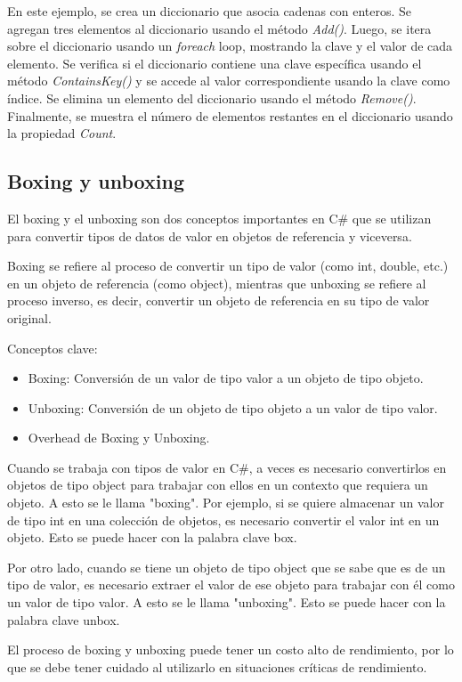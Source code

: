 \documentclass[executivepaper]{article}
\begin{document}
En este ejemplo, se crea un diccionario que asocia cadenas con enteros. Se agregan tres elementos al diccionario usando el método \emph{Add()}. Luego, se itera sobre el diccionario usando un \emph{foreach} loop, mostrando la clave y el valor de cada elemento. Se verifica si el diccionario contiene una clave específica usando el método \emph{ContainsKey()} y se accede al valor correspondiente usando la clave como índice. Se elimina un elemento del diccionario usando el método \emph{Remove()}. Finalmente, se muestra el número de elementos restantes en el diccionario usando la propiedad \emph{Count}.

\subsection*{Boxing y unboxing}

El boxing y el unboxing son dos conceptos importantes en C\# que se utilizan para convertir tipos de datos de valor en objetos de referencia y viceversa.

Boxing se refiere al proceso de convertir un tipo de valor (como int, double, etc.) en un objeto de referencia (como object), mientras que unboxing se refiere al proceso inverso, es decir, convertir un objeto de referencia en su tipo de valor original.

Conceptos clave:
\begin{itemize}
\item Boxing: Conversión de un valor de tipo valor a un objeto de tipo objeto.
\item Unboxing: Conversión de un objeto de tipo objeto a un valor de tipo valor.
\item Overhead de Boxing y Unboxing.
\end{itemize}

Cuando se trabaja con tipos de valor en C\#, a veces es necesario convertirlos en objetos de tipo object para trabajar con ellos en un contexto que requiera un objeto. A esto se le llama "boxing". Por ejemplo, si se quiere almacenar un valor de tipo int en una colección de objetos, es necesario convertir el valor int en un objeto. Esto se puede hacer con la palabra clave box.

Por otro lado, cuando se tiene un objeto de tipo object que se sabe que es de un tipo de valor, es necesario extraer el valor de ese objeto para trabajar con él como un valor de tipo valor. A esto se le llama "unboxing". Esto se puede hacer con la palabra clave unbox.

El proceso de boxing y unboxing puede tener un costo alto de rendimiento, por lo que se debe tener cuidado al utilizarlo en situaciones críticas de rendimiento.
\end{document}
